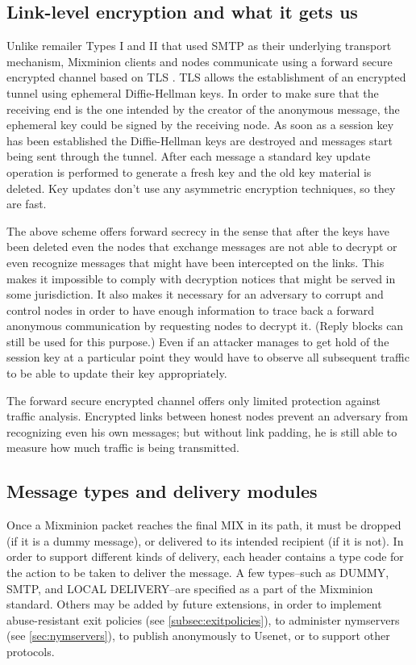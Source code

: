 \documentclass{llncs}
\begin{document}

\subsection{Link-level encryption and what it gets us}

Unlike remailer Types I and II that used SMTP as their underlying 
transport mechanism, Mixminion clients and nodes communicate using a
forward secure encrypted channel based on TLS \cite{TLS}.  TLS allows
the establishment of an encrypted tunnel using ephemeral
Diffie-Hellman keys. In order to make sure that the receiving end is
the one intended by the creator of the anonymous message, the
ephemeral key could be signed by the receiving node. As soon as a
session key has been established the Diffie-Hellman keys are destroyed
and messages start being sent through the tunnel. After each message a
standard key update operation is performed to generate a fresh key and
the old key material is deleted. Key updates don't use any asymmetric
encryption techniques, so they are fast.

The above scheme offers forward secrecy in the sense that after the keys
have been deleted even the
nodes that exchange messages are not able to decrypt or even recognize
messages that might have been intercepted on the links. This makes it
impossible to comply with decryption notices that might be served in
some jurisdiction.  It also makes it necessary for an adversary to
corrupt and control nodes in order to have enough information to trace
back a forward anonymous communication by requesting nodes to decrypt
it. (Reply blocks can still be used for this purpose.)  Even if an
attacker manages to get hold of the session key at a particular point
they would have to observe all subsequent traffic to be able to update
their key appropriately.

The forward secure encrypted channel offers only limited protection
against traffic analysis. Encrypted links between honest nodes prevent
an adversary from recognizing even his own messages; but without
link padding, he is still able to measure how much traffic is being
transmitted.

\subsection{Message types and delivery modules}

Once a Mixminion packet reaches the final MIX in its path, it must be
dropped (if it is a dummy message), or delivered to its intended
recipient (if it is not).  In order to support different kinds of
delivery, each header contains a type code for the action to be taken
to deliver the message.  A few types--such as DUMMY, SMTP, and LOCAL
DELIVERY--are specified as a part of the Mixminion standard.  Others
may be added by future extensions, in order to implement
abuse-resistant exit policies (see \ref{subsec:exitpolicies}), to
administer nymservers (see \ref{sec:nymservers}), to publish
anonymously to Usenet, or to support other protocols.
\end{document}
